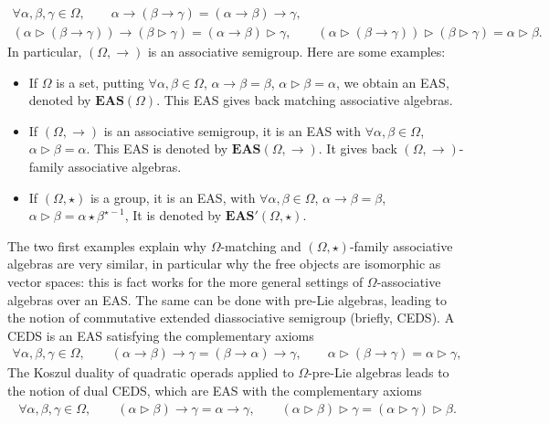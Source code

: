 \documentclass[pdftex]{sigma}
\numberwithin{equation}{section}
\newcommand{\eas}{\mathbf{EAS}}
\begin{document}
\begin{gather*}
\forall \alpha,\beta,\gamma \in \Omega,\qquad \alpha \rightarrow (\beta \rightarrow \gamma)=(\alpha \rightarrow \beta) \rightarrow \gamma,\\
(\alpha \triangleright (\beta \rightarrow \gamma))\rightarrow (\beta \triangleright \gamma)=(\alpha \rightarrow \beta)\triangleright \gamma,\qquad
(\alpha \triangleright (\beta \rightarrow \gamma))\triangleright (\beta \triangleright \gamma)=\alpha \triangleright \beta.
\end{gather*}
In particular, $(\Omega,\rightarrow)$ is an associative semigroup. Here are some examples:
\begin{itemize}\itemsep=0pt
\item If $\Omega$ is a set, putting
$
 \forall \alpha,\beta \in \Omega$, $ \alpha \rightarrow\beta =\beta$, $\alpha \triangleright \beta =\alpha$,
we obtain an EAS, denoted by $\eas(\Omega)$. This EAS gives back matching associative algebras.
\item If $(\Omega,\rightarrow)$ is an associative semigroup, it is an EAS with
$\forall \alpha,\beta \in \Omega$, $\alpha \triangleright \beta =\alpha$.
This EAS is denoted by $\eas(\Omega,\rightarrow)$. It gives back $(\Omega,\rightarrow)$-family associative algebras.
\item If $(\Omega,\star)$ is a group, it is an EAS, with
$
 \forall \alpha,\beta \in \Omega$, $\alpha \rightarrow\beta =\beta$, $\alpha \triangleright \beta =\alpha\star \beta^{\star -1}$,
It is denoted by $\eas'(\Omega,\star)$. \end{itemize}
The two first examples explain why $\Omega$-matching and $(\Omega,\star)$-family associative algebras are very similar, in particular why the free objects are isomorphic as vector spaces:
this is fact works for the more general settings of $\Omega$-associative algebras over an EAS.
The same can be done with pre-Lie algebras, leading to the notion of commutative extended diassociative semigroup (briefly, CEDS). A CEDS is an EAS satisfying the complementary axioms
\begin{gather*}
\forall \alpha,\beta,\gamma \in \Omega,\qquad(\alpha \rightarrow \beta) \rightarrow \gamma =(\beta \rightarrow \alpha) \rightarrow \gamma,\qquad
\alpha \triangleright (\beta \rightarrow \gamma) =\alpha \triangleright \gamma,
\end{gather*}
The Koszul duality of quadratic operads applied to $\Omega$-pre-Lie algebras leads to the notion of dual CEDS, which are EAS with the complementary axioms
\begin{gather*}
 \forall \alpha,\beta,\gamma \in \Omega,\qquad (\alpha \triangleright \beta) \rightarrow \gamma=\alpha \rightarrow \gamma,\qquad
(\alpha \triangleright \beta) \triangleright \gamma =(\alpha \triangleright \gamma)\triangleright \beta.
\end{gather*}
\end{document}

